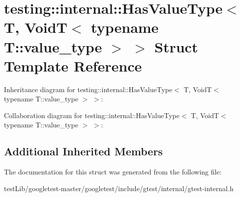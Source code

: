 \hypertarget{structtesting_1_1internal_1_1HasValueType_3_01T_00_01VoidT_3_01typename_01T_1_1value__type_01_4_01_4}{}\section{testing\+:\+:internal\+:\+:Has\+Value\+Type$<$ T, VoidT$<$ typename T\+:\+:value\+\_\+type $>$ $>$ Struct Template Reference}
\label{structtesting_1_1internal_1_1HasValueType_3_01T_00_01VoidT_3_01typename_01T_1_1value__type_01_4_01_4}


Inheritance diagram for testing\+:\+:internal\+:\+:Has\+Value\+Type$<$ T, VoidT$<$ typename T\+:\+:value\+\_\+type $>$ $>$\+:


Collaboration diagram for testing\+:\+:internal\+:\+:Has\+Value\+Type$<$ T, VoidT$<$ typename T\+:\+:value\+\_\+type $>$ $>$\+:
\subsection*{Additional Inherited Members}


The documentation for this struct was generated from the following file\+:\begin{DoxyCompactItemize}
\item 
test\+Lib/googletest-\/master/googletest/include/gtest/internal/gtest-\/internal.\+h\end{DoxyCompactItemize}
